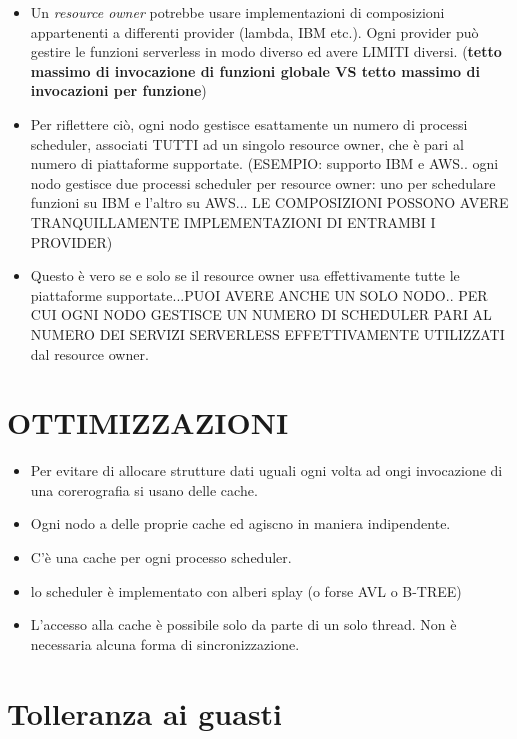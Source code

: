 \documentclass[10pt,a4paper]{report}
\begin{document}
\begin{itemize}
\item Un \textit{resource owner} potrebbe usare implementazioni di composizioni appartenenti a differenti provider (lambda, IBM etc.). Ogni provider può gestire le funzioni serverless in modo diverso ed avere LIMITI diversi. (\textbf{tetto massimo di invocazione di funzioni globale VS tetto massimo di invocazioni per funzione})

\item Per riflettere ciò, ogni nodo gestisce esattamente un numero di processi scheduler, associati TUTTI ad un singolo resource owner, che è pari al numero di piattaforme supportate. (ESEMPIO: supporto IBM e AWS.. ogni nodo gestisce due processi scheduler per resource owner: uno per schedulare funzioni su IBM e l'altro su AWS... LE COMPOSIZIONI POSSONO AVERE TRANQUILLAMENTE IMPLEMENTAZIONI DI ENTRAMBI I PROVIDER)

\item Questo è vero se e solo se il resource owner usa effettivamente tutte le piattaforme supportate...PUOI AVERE ANCHE UN SOLO NODO.. PER CUI OGNI NODO GESTISCE UN NUMERO DI SCHEDULER PARI AL NUMERO DEI SERVIZI SERVERLESS EFFETTIVAMENTE UTILIZZATI dal resource owner.

\end{itemize}

\section{OTTIMIZZAZIONI}

\begin{itemize}
\item Per evitare di allocare strutture dati uguali ogni volta ad ongi invocazione di una corerografia si usano delle cache.

\item Ogni nodo a delle proprie cache ed agiscno in maniera indipendente.

\item C'è una cache per ogni processo scheduler.

\item lo scheduler è implementato con alberi splay (o forse AVL o B-TREE)

\item L'accesso alla cache è possibile solo da parte di un solo thread. Non è necessaria alcuna forma di sincronizzazione.
\end{itemize}

\section{Tolleranza ai guasti}
\end{document}
